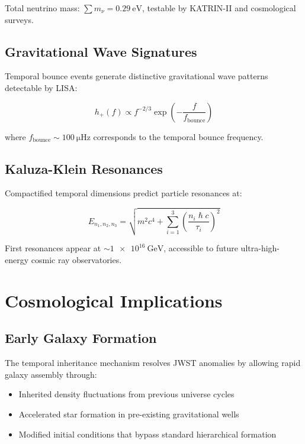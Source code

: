 \documentclass[reprint,amsmath,amssymb,aps,prd,nofootinbib]{revtex4-2}
\begin{document}
Total neutrino mass: $\sum m_\nu = \SI{0.29}{\electronvolt}$, testable by KATRIN-II and cosmological surveys.

\subsection{Gravitational Wave Signatures}

Temporal bounce events generate distinctive gravitational wave patterns detectable by LISA:

\begin{equation}
h_+(f) \propto f^{-2/3} \exp\left(-\frac{f}{f_{\text{bounce}}}\right)
\label{eq:gw_signature}
\end{equation}

where $f_{\text{bounce}} \sim \SI{100}{\micro\hertz}$ corresponds to the temporal bounce frequency.

\subsection{Kaluza-Klein Resonances}

Compactified temporal dimensions predict particle resonances at:

\begin{equation}
E_{n_1,n_2,n_3} = \sqrt{m^2c^4 + \sum_{i=1}^{3}\left(\frac{n_i\hslash c}{\tau_i}\right)^2}
\label{eq:kk_resonances}
\end{equation}

First resonances appear at $\sim\SI{1e16}{\giga\electronvolt}$, accessible to future ultra-high-energy cosmic ray observatories.

\section{Cosmological Implications}\label{sec:cosmology}

\subsection{Early Galaxy Formation}

The temporal inheritance mechanism resolves JWST anomalies by allowing rapid galaxy assembly through:

\begin{itemize}
\item Inherited density fluctuations from previous universe cycles
\item Accelerated star formation in pre-existing gravitational wells
\item Modified initial conditions that bypass standard hierarchical formation
\end{itemize}
\end{document}
